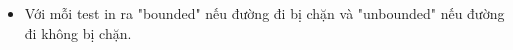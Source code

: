 \begin{itemize}
	\item     Với mỗi test in ra "bounded" nếu đường đi bị chặn và "unbounded" nếu đường đi không bị chặn.   
\end{itemize}